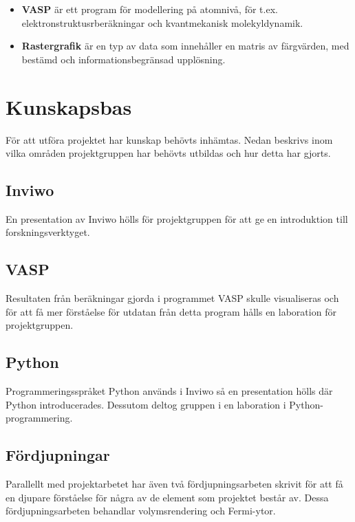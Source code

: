 \documentclass[a4paper,12pt]{article}
\begin{document}
\begin{itemize}
\item \textbf{VASP} är ett program för modellering på atomnivå, för t.ex. elektronstruktusrberäkningar och kvantmekanisk molekyldynamik.
\cite{VASP}

\item \textbf{Rastergrafik} är en typ av data som innehåller en matris av färgvärden, med bestämd och informationsbegränsad upplösning.
\cite{raster}


\end{itemize}

\section{Kunskapsbas}
\label{kunskapsbas}
För att utföra projektet har kunskap behövts inhämtas. Nedan beskrivs inom vilka områden projektgruppen har behövts utbildas och hur detta har gjorts.
\subsection{Inviwo}
En presentation av Inviwo hölls för projektgruppen för att ge en introduktion till forskningsverktyget. 
\subsection{VASP}
Resultaten från beräkningar gjorda i programmet VASP skulle visualiseras och för att få mer förståelse för utdatan från detta program hålls en laboration för projektgruppen. 
\subsection{Python}
Programmeringsspråket Python används i Inviwo så en presentation hölls där Python introducerades. Dessutom deltog gruppen i en laboration i Python-programmering.
\subsection{Fördjupningar}
Parallellt med projektarbetet har även två fördjupningsarbeten skrivit för att få en djupare förståelse för några av de element som projektet består av. Dessa fördjupningsarbeten behandlar volymsrendering och Fermi-ytor.
\end{document}
